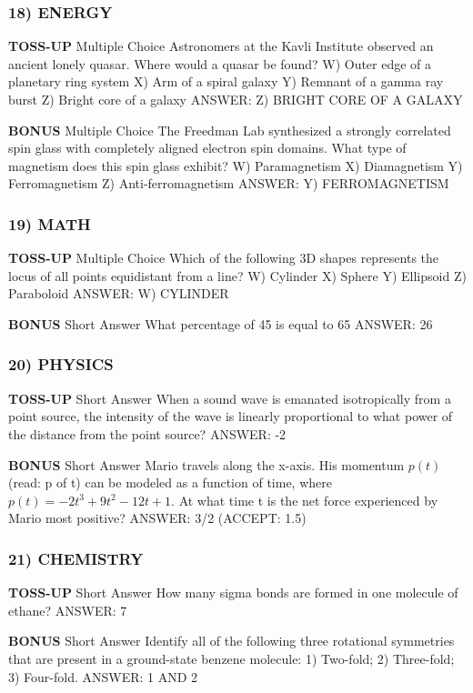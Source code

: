 \documentclass{article}
\begin{document}
\subsubsection*{18) ENERGY}
\textbf{TOSS-UP}
Multiple Choice Astronomers at the Kavli Institute observed an ancient lonely quasar. Where would a quasar be found?
W) Outer edge of a planetary ring system
X) Arm of a spiral galaxy
Y) Remnant of a gamma ray burst
Z) Bright core of a galaxy
ANSWER: Z) BRIGHT CORE OF A GALAXY

\textbf{BONUS}
Multiple Choice The Freedman Lab synthesized a strongly correlated spin glass with completely aligned electron spin domains. What type of magnetism does this spin glass exhibit?
W) Paramagnetism
X) Diamagnetism
Y) Ferromagnetism
Z) Anti-ferromagnetism
ANSWER: Y) FERROMAGNETISM

\subsubsection*{19) MATH}
\textbf{TOSS-UP}
Multiple Choice Which of the following 3D shapes represents the locus of all points equidistant from a line?
W) Cylinder
X) Sphere
Y) Ellipsoid
Z) Paraboloid
ANSWER: W) CYLINDER

\textbf{BONUS}
Short Answer What percentage of 45 is equal to 65%
ANSWER: 26

\subsubsection*{20) PHYSICS}
\textbf{TOSS-UP}
Short Answer When a sound wave is emanated isotropically from a point source, the intensity of the wave is linearly proportional to what power of the distance from the point source?
ANSWER: -2

\textbf{BONUS}
Short Answer Mario travels along the x-axis. His momentum $p(t)$ (read: p of t) can be modeled as a function of time, where $p(t)=-2t^{3}+9t^{2}-12t+1$. At what time t is the net force experienced by Mario most positive?
ANSWER: 3/2 (ACCEPT: 1.5)

\subsubsection*{21) CHEMISTRY}
\textbf{TOSS-UP}
Short Answer How many sigma bonds are formed in one molecule of ethane?
ANSWER: 7

\textbf{BONUS}
Short Answer Identify all of the following three rotational symmetries that are present in a ground-state benzene molecule: 1) Two-fold; 2) Three-fold; 3) Four-fold.
ANSWER: 1 AND 2
\end{document}
